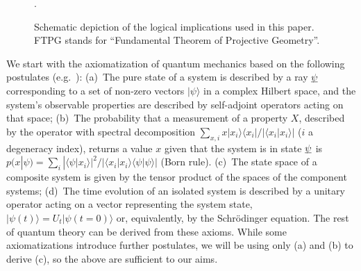 \documentclass[aps,prl,amsmath,amssymb,twocolumn]{revtex4}
\theoremstyle{plain}
\theoremstyle{definition}
\theoremstyle{remark}
\newcommand{\pj}[1] {\underbar{$#1$}}
\def\>{\rangle}
\def\<{\langle}
\def\commentg#1{ [{\bf Comment Gabriele:} {\sf #1}]}
\def\togli#1{}
\begin{document}
	\begin{figure}[ht]
		.\hsize\leavevmode{}
		\caption{Schematic depiction of the logical implications used in
			this paper. FTPG stands for ``Fundamental Theorem of Projective
			Geometry''.  \label{f:fig}}\end{figure}
	
	We start with the axiomatization of quantum mechanics based on the
	following postulates
	(e.g.~\cite{ozawa,masanes,wootters,nielsenchuang}): (a)~The pure state
	of a system is described by a ray $\pj{\psi}$ corresponding to a set
	of non-zero vectors $|\psi\>$ in a complex Hilbert space, and the
	system's observable properties are described by self-adjoint operators
	acting on that space; (b)~The probability that a measurement of a
	property $X$, described by the operator with spectral decomposition
	$\sum_{x,i}x|x_i\>\<x_i|/|\<x_i|x_i\>|$ ($i$ a degeneracy index),
	returns a value $x$ given that the system is in state $\pj{\psi}$ is
	$p(x|\psi)=\sum_i|\<\psi|x_i\>|^2/|\<x_i|x_i\>\<\psi|\psi\>|$ (Born
	rule). (c)~The state space of a composite system is given by the
	tensor product of the spaces of the component systems; (d)~The time
	evolution of an isolated system is described by a unitary operator
	acting on a vector representing the system state,
	$|\psi({t})\>=U_{t}|\psi({t}=0)\>$ or, equivalently, by the
	Schr\"odinger equation. The rest of quantum theory can be derived from
	these axioms. While some axiomatizations introduce further postulates,
	we will be using only (a) and (b) to derive (c), so the above are
	sufficient to our aims.
	
	\togli{This axiomatization implicitly contains a definition of
		``quantum system'' which is crucial for what follows, so we need to
		clarify the assumptions that it contains. We will use the following
		definition for a quantum
		system\togli{$\stackon[1pt]={\mbox{\tiny
					def}}$}$\stackrel{\mbox{\tiny def}}=${\em ``a quantum degree
			of freedom with $d$ (possibly discrete, or continuous, infinite)
			mutually exclusive (commuting) values for each of its properties.
			Its mathematical description is through a Hilbert space of
			dimension $d$ which contains all the states that describe the
			values of its possible properties. In accordance with the
			postulate (a), these values correspond to a basis of the space,
			given by the eigenvectors of the observable corresponding to that
			property''}. \commentg{We may have to revise to be more clear.
			Where is this used?} }
	
\end{document}
